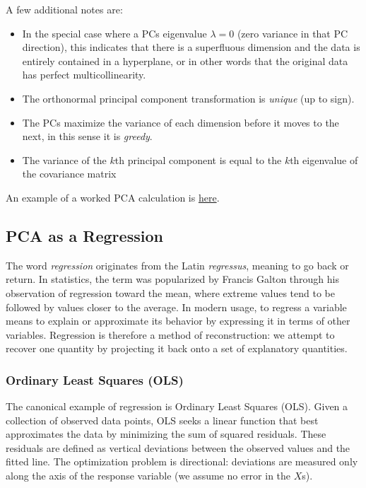 \medskip

A few additional notes are:
\begin{itemize}[label=$\circ$]
    \item In the special case where a PCs eigenvalue $\lambda = 0$ (zero variance in that PC direction), this indicates that there is a superfluous dimension and the data is entirely contained in a hyperplane, or in other words that the original data has perfect multicollinearity.
    \item The orthonormal principal component transformation is \textit{unique} (up to sign).
    \item The PCs maximize the variance of each dimension before it moves to the next, in this sense it is \textit{greedy}.
    \item The variance of the $k$th principal component is equal to the $k$th eigenvalue of the covariance matrix
\end{itemize}

An example of a worked PCA calculation is \hyperref[worked-pca-two-variables]{here}.

\bigskip

\subsection{PCA as a Regression}

\medskip

The word \textit{regression} originates from the Latin \textit{regressus}, meaning to go back or return. In statistics, the term was popularized by Francis Galton through his observation of regression toward the mean, where extreme values tend to be followed by values closer to the average. In modern usage, to regress a variable means to explain or approximate its behavior by expressing it in terms of other variables. Regression is therefore a method of reconstruction: we attempt to recover one quantity by projecting it back onto a set of explanatory quantities.

\medskip

\subsubsection{Ordinary Least Squares (OLS)}

The canonical example of regression is Ordinary Least Squares (OLS). Given a collection of observed data points, OLS seeks a linear function that best approximates the data by minimizing the sum of squared residuals. These residuals are defined as vertical deviations between the observed values and the fitted line. The optimization problem is directional: deviations are measured only along the axis of the response variable (we assume no error in the $X$s).

